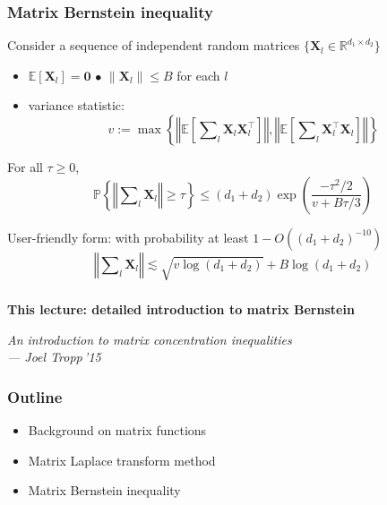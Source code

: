 \documentclass[compress,
mathserif,wide,%
]{beamer}
\begin{document}
\begin{frame}
\frametitle{Matrix Bernstein inequality}

Consider a sequence of independent random matrices $\big\{ \bm{X}_{l}\in\mathbb{R}^{d_{1}\times d_{2}}\big\} $
%
\begin{itemize}
	\itemsep0.5em
	\item $\mathbb{E}[\bm{X}_l]=\bm{0}$ \qquad\qquad\qquad\qquad\qquad $\bullet$ $\|\bm{X}_{l}\|\leq B$ for each $l$
	\item variance statistic: 
	$$v:=\max\left\{  \left\Vert  \mathbb{E}\left[ \sum\nolimits_{l} \bm{X}_{l}\bm{X}_{l}^{\top}  \right]  \right\Vert  ,  
			  \left\Vert  \mathbb{E}\left[ \sum\nolimits_{l} \bm{X}_{l}^{\top}\bm{X}_{l}  \right]  \right\Vert  \right\} $$
\end{itemize}

\begin{theorem}\label{thm:mtx-Bernstein}
%
For all $\tau \geq 0$,
\vspace{-1em}
\[
\mathbb{P}\left\{ \left\Vert \sum\nolimits_{l}\bm{X}_{l}\right\Vert \geq \tau\right\} \leq\left(d_{1}+d_{2}\right)\exp\left(\frac{-\tau^{2}/2}{v+B\tau/3}\right)
\]
%
\end{theorem}

\pause
User-friendly form: with probability at least $1- O((d_1 +d_2)^{-10})$
\begin{equation} \label{eq:Bernstein-user-friendly}
		\left\Vert \sum\nolimits_{l}\bm{X}_{l}\right\Vert \lesssim  \sqrt{ v \log(d_1+d_2) } + B \log(d_1+d_2)
	\end{equation}
\end{frame}









\begin{frame}[plain]
\frametitle{}  

\vfill
\centering
	{\large\bf This lecture: detailed introduction to matrix Bernstein}

\bigskip
\bigskip

\hfill {\small\em An introduction to matrix concentration inequalities \\ \hfill --- Joel Tropp\,'15}

\vfill

\end{frame}


\begin{frame}
\frametitle{Outline}

\begin{itemize}
  \itemsep1em
  \item Background on matrix functions
  \item Matrix Laplace transform method
  \item Matrix Bernstein inequality
\end{itemize}

\end{frame}
\end{document}
